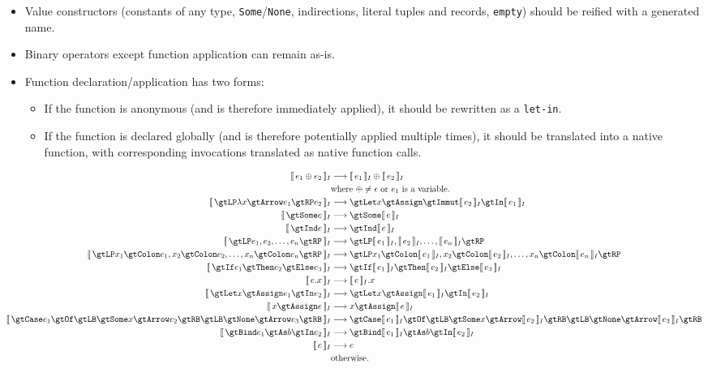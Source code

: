 \documentclass{article}
\begin{document}
    \begin{itemize}
        \item Value constructors (constants of any type, \texttt{Some}/\texttt{None}, indirections,
            literal tuples and records, \texttt{empty}) should be reified with a generated name.
        \item Binary operators except function application can remain as-is.
        \item Function declaration/application has two forms:
            \begin{itemize}
                \item If the function is anonymous (and is therefore immediately applied), it should
                    be rewritten as a \texttt{let-in}.
                \item If the function is declared globally (and is therefore potentially applied
                    multiple times), it should be translated into a native function, with
                    corresponding invocations translated as native function calls.
            \end{itemize}
    \end{itemize}
%
    \begin{align*}
        \eqI{e_1 \oplus e_2}{\intI{e_1} \oplus \intI{e_2}}{where $\oplus \neq \epsilon$ or $e_1$ is a variable.} \\
        \eqI{\gtLP \lambda x \gtArrow e_1 \gtRP e_2}{\gtLet x \gtAssign \gtImmut \intI{e_2} \gtIn \intI{e_1}}{} \\
        \eqI{\gtSome e}{\gtSome \intI{e}}{} \\
        \eqI{\gtInd e}{\gtInd \intI{e}}{} \\
        \eqI{\gtLP e_1, e_2, \ldots, e_n \gtRP}{\gtLP \intI{e_1}, \intI{e_2}, \ldots, \intI{e_n} \gtRP}{} \\
        \eqI{\gtLP x_1 \gtColon e_1, x_2 \gtColon e_2, \ldots, x_n \gtColon e_n \gtRP}
            {\gtLP x_1 \gtColon \intI{e_1}, x_2 \gtColon \intI{e_2}, \ldots, x_n \gtColon \intI{e_n} \gtRP}{} \\
        \eqI{\gtIf e_1 \gtThen e_2 \gtElse e_3}{\gtIf \intI{e_1} \gtThen \intI{e_2} \gtElse \intI{e_3}}{} \\
        \eqI{e.x}{\intI{e}.x}{} \\
        \eqI{\gtLet x \gtAssign e_1 \gtIn e_2}{\gtLet x \gtAssign \intI{e_1} \gtIn \intI{e_2}}{} \\
        \eqI{x \gtAssign e}{x \gtAssign \intI{e}}{} \\
        \eqI{\gtCase e_1 \gtOf \gtLB \gtSome x \gtArrow e_2 \gtRB
                \gtLB \gtNone \gtArrow e_3 \gtRB}
            {\gtCase \intI{e_1} \gtOf \gtLB \gtSome x \gtArrow \intI{e_2} \gtRB
                \gtLB \gtNone \gtArrow \intI{e_3} \gtRB}
            {} \\
        \eqI{\gtBind e_1 \gtAs b \gtIn e_2}{\gtBind \intI{e_1} \gtAs b \gtIn \intI{e_2}}{} \\
        \eqI{e}{e}{otherwise.}
    \end{align*}
\end{document}
